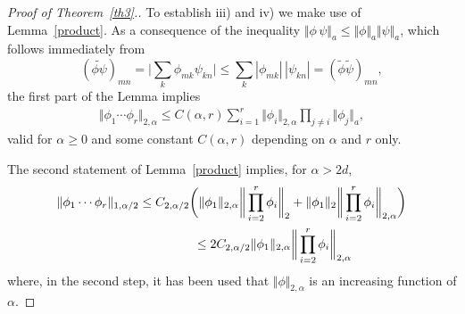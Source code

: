 \documentclass[11pt]{article}
\begin{document}
\begin{proof}[Proof of Theorem~\ref{th3}.]
To establish iii) and iv) we make use of Lemma~\ref{product}. As a
consequence of the inequality
$\Vert\phi\,\psi\Vert_a\leq\Vert\phi\Vert_a \Vert\psi\Vert_a$, which
follows immediately from
\[
(\widetilde{\phi\psi})_{mn} = \bigg|\sum_k\phi_{mk} \psi_{kn}\bigg| \leq \sum_k|\phi_{mk}|\,|\psi_{kn}| = (\widetilde\phi \widetilde\psi)_{mn} ,
\]
the f\/irst part of the Lemma implies
\begin{gather}
\label{prodnorm1}
\Vert\phi_1\cdots\phi_r\Vert_{2,\alpha}\leq
C(\alpha,r)  \sum_{i=1}^r\Vert\phi_i\Vert_{2,\alpha} \prod_{j\ne i}\Vert\phi_j\Vert_a ,
\end{gather}
valid for $\alpha\geq 0$ and some constant $C(\alpha,r)$ depending
on $\alpha$ and $r$ only.

The second statement of Lemma~\ref{product} implies, for $\alpha>2d$,
\begin{gather*}%
\Vert\phi_1\cdots\phi_r\Vert_{1,\alpha/2} \leq
C_{2,\alpha/2} \bigg(\Vert\phi_1\Vert_{2,\alpha} \bigg\Vert\prod_{i=2}^r\phi_i\bigg\Vert_2 +
 \Vert\phi_1\Vert_2 \bigg\Vert\prod_{i=2}^r\phi_i\bigg\Vert_{2,\alpha}\bigg)\\
 \hphantom{\Vert\phi_1\cdots\phi_r\Vert_{1,\alpha/2}}{}
 \leq
2C_{2,\alpha/2} \Vert\phi_1\Vert_{2,\alpha} \bigg\Vert\prod_{i=2}^r\phi_i\bigg\Vert_{2,\alpha}
\end{gather*}
 where, in the second step, it has been used that $\Vert\phi\Vert_{2,\alpha}$ is an
increasing function of $\alpha$.


\end{proof}
\end{document}

